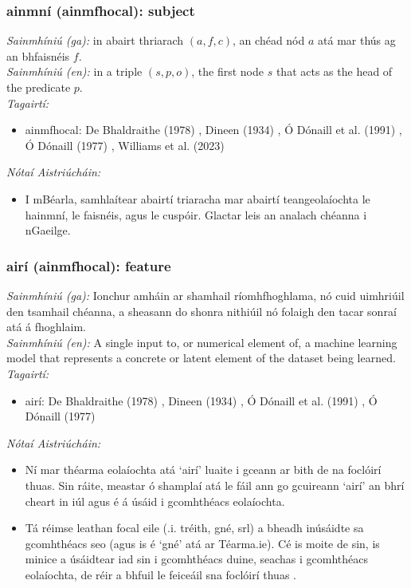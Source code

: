 \subsubsection*{ainmní (ainmfhocal): subject}
 \noindent \textit{Sainmhíniú (ga):} in abairt thriarach $(a,f,c)$, an chéad nód $a$ atá mar thús ag an bhfaisnéis $f$.
\\
 \noindent \textit{Sainmhíniú (en):} in a triple $(s,p,o)$, the first node $s$ that acts as the head of the predicate $p$.
\\
 \noindent \textit{Tagairtí:}
\begin{itemize}
	\item ainmfhocal: De Bhaldraithe (1978) \cite{de-bhaldraithe}, Dineen (1934) \cite{dineen}, Ó Dónaill et al. (1991) \cite{focloir-beag}, Ó Dónaill (1977) \cite{odonaill}, Williams et al. (2023) \cite{storchiste}
\end{itemize}

 \noindent \textit{Nótaí Aistriúcháin:}
\begin{itemize}
	\item I mBéarla, samhlaítear abairtí triaracha mar abairtí teangeolaíochta le hainmní, le faisnéis, agus le cuspóir. Glactar leis an analach chéanna i nGaeilge.
\end{itemize}


\subsubsection*{airí (ainmfhocal): feature}
 \noindent \textit{Sainmhíniú (ga):} Ionchur amháin ar shamhail ríomhfhoghlama, nó cuid uimhriúil den tsamhail chéanna, a sheasann do shonra nithiúil nó folaigh den tacar sonraí atá á fhoghlaim.
\\
 \noindent \textit{Sainmhíniú (en):} A single input to, or numerical element of, a machine learning model that represents a concrete or latent element of the dataset being learned.
\\
 \noindent \textit{Tagairtí:}
\begin{itemize}
	\item airí: De Bhaldraithe (1978) \cite{de-bhaldraithe}, Dineen (1934) \cite{dineen}, Ó Dónaill et al. (1991) \cite{focloir-beag}, Ó Dónaill (1977) \cite{odonaill}
\end{itemize}

 \noindent \textit{Nótaí Aistriúcháin:}
\begin{itemize}
	\item Ní mar théarma eolaíochta atá `airí' luaite i gceann ar bith de na foclóirí thuas. Sin ráite, meastar ó shamplaí atá le fáil ann go gcuireann `airí' an bhrí cheart in iúl agus é á úsáid i gcomhthéacs eolaíochta.
	\item Tá réimse leathan focal eile (.i. tréith, gné, srl) a bheadh inúsáidte sa gcomhthéacs seo (agus is é `gné' atá ar Téarma.ie). Cé is moite de sin, is minice a úsáidtear iad sin i gcomhthéacs duine, seachas i gcomhthéacs eolaíochta, de réir a bhfuil le feiceáil sna foclóirí thuas .
\end{itemize}


